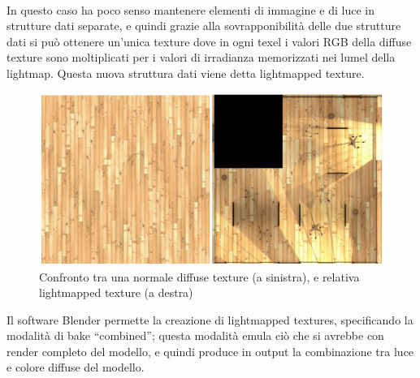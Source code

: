 \\
In questo caso ha poco senso mantenere elementi di immagine e di luce in strutture dati separate, e quindi grazie alla sovrapponibilità delle due strutture dati si può ottenere un’unica texture dove in ogni texel i valori RGB della diffuse texture sono moltiplicati per i valori di irradianza memorizzati nei lumel della lightmap. Questa nuova struttura dati viene detta lightmapped texture. 
\\
\begin{figure}[htb]
 \centering
 \includegraphics[width=1\linewidth]{images/chapter_lrl/lrl_li_te.png}\hfill
 \caption[Lightmapped texture]{Confronto tra una normale diffuse texture (a sinistra), e relativa lightmapped texture (a destra)}
 \label{fig:lrl_li_te}
\end{figure}
Il software Blender permette la creazione di lightmapped textures, specificando la modalità di bake “combined”; questa modalità emula ciò che si avrebbe con render completo del modello, e quindi produce in output la combinazione tra luce e colore diffuse del modello.